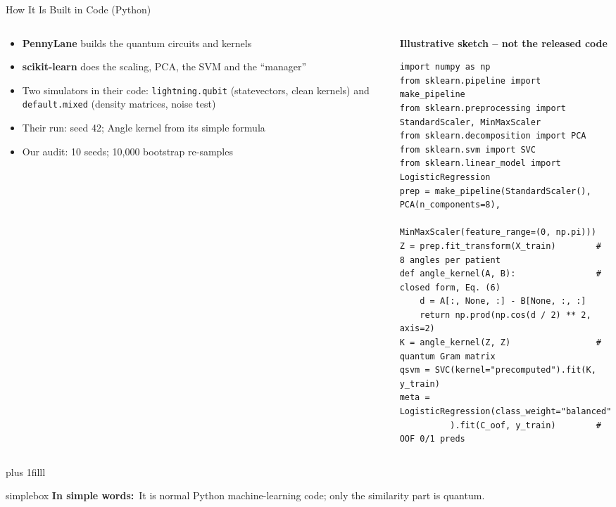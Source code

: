 \documentclass[aspectratio=169,11pt,t,xcolor={table}]{beamer}
\newcommand{\insimple}[1]{%
  \par\vskip 0pt plus 1filll
  \begin{beamercolorbox}[wd=\textwidth,sep=4pt,rounded=true]{simplebox}%
    \small\textbf{\textcolor{qamber!75!black}{In simple words:}}\ #1%
  \end{beamercolorbox}\vskip1pt}
\begin{document}
\begin{frame}[fragile]{How It Is Built in Code (Python)}
  \begin{columns}[T,onlytextwidth]
    \begin{column}{0.36\textwidth}
      \scriptsize
      \begin{itemize}\setlength{\itemsep}{3pt}
        \item \textbf{PennyLane} builds the quantum circuits and kernels
        \item \textbf{scikit-learn} does the scaling, PCA, the SVM and the ``manager''
        \item Two simulators in their code: \texttt{lightning.qubit} (statevectors, clean kernels) and \texttt{default.mixed} (density matrices, noise test)
        \item Their run: seed 42; Angle kernel from its simple formula
        \item Our audit: 10 seeds; 10,000 bootstrap re-samples
      \end{itemize}
    \end{column}
    \begin{column}{0.62\textwidth}
      {\scriptsize\bfseries\color{qred}Illustrative sketch -- not the released code}
\begin{lstlisting}[style=py]
import numpy as np
from sklearn.pipeline import make_pipeline
from sklearn.preprocessing import StandardScaler, MinMaxScaler
from sklearn.decomposition import PCA
from sklearn.svm import SVC
from sklearn.linear_model import LogisticRegression
prep = make_pipeline(StandardScaler(), PCA(n_components=8),
                     MinMaxScaler(feature_range=(0, np.pi)))
Z = prep.fit_transform(X_train)        # 8 angles per patient
def angle_kernel(A, B):                # closed form, Eq. (6)
    d = A[:, None, :] - B[None, :, :]
    return np.prod(np.cos(d / 2) ** 2, axis=2)
K = angle_kernel(Z, Z)                 # quantum Gram matrix
qsvm = SVC(kernel="precomputed").fit(K, y_train)
meta = LogisticRegression(class_weight="balanced"
          ).fit(C_oof, y_train)        # OOF 0/1 preds
\end{lstlisting}
    \end{column}
  \end{columns}
  \insimple{It is normal Python machine-learning code; only the similarity part is quantum.}
\end{frame}
\end{document}
